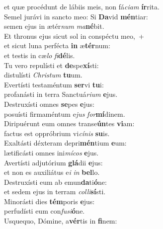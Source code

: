 \evenverse et quæ procédunt de lábiis meis, non fá\textit{ci}\textit{am} \textbf{ír}rita.\\
\oddverse Semel jurávi in sancto meo: Si \textbf{Da}vid \textbf{mén}tiar:~\*\\
\oddverse semen ejus in ætér\textit{num} \textit{ma}\textbf{né}bit.\\
\evenverse Et thronus ejus sicut sol in conspéctu meo,~+\\
\evenverse  et sicut luna perfécta \textbf{in} æ\textbf{tér}num:~\*\\
\evenverse et testis in cæ\textit{lo} \textit{fi}\textbf{dé}lis.\\
\oddverse Tu vero repulísti et \textbf{de}spe\textbf{xí}sti:~\*\\
\oddverse distulísti \textit{Chri}\textit{stum} \textbf{tu}um.\\
\evenverse Evertísti testaméntum \textbf{ser}vi \textbf{tu}i:~\*\\
\evenverse profanásti in terra Sanctuá\textit{ri}\textit{um} \textbf{e}jus.\\
\oddverse Destruxísti omnes \textbf{se}pes \textbf{e}jus:~\*\\
\oddverse posuísti firmaméntum e\textit{jus} \textit{for}\textbf{mí}dinem.\\
\evenverse Diripuérunt eum omnes transe\textbf{ún}tes \textbf{vi}am:~\*\\
\evenverse factus est oppróbrium vi\textit{cí}\textit{nis} \textbf{su}is.\\
\oddverse Exaltásti déxteram depri\textbf{mén}tium \textbf{e}um:~\*\\
\oddverse lætificásti omnes ini\textit{mí}\textit{cos} \textbf{e}jus.\\
\evenverse Avertísti adjutórium \textbf{glá}dii \textbf{e}jus:~\*\\
\evenverse et non es auxiliátus e\textit{i} \textit{in} \textbf{bel}lo.\\
\oddverse Destruxísti eum ab emun\textbf{da}ti\textbf{ó}ne:~\*\\
\oddverse et sedem ejus in terram \textit{col}\textit{li}\textbf{sí}sti.\\
\evenverse Minorásti dies \textbf{tém}poris \textbf{e}jus:~\*\\
\evenverse perfudísti eum con\textit{fu}\textit{si}\textbf{ó}ne.\\
\oddverse Usquequo, Dómine, a\textbf{vér}tis in \textbf{fi}nem:~\*\\
